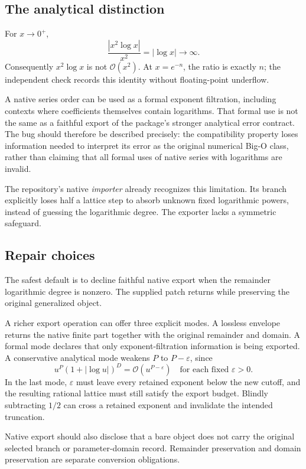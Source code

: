 \documentclass[11pt,a4paper]{article}
\newcommand{\code}[1]{\texttt{\detokenize{#1}}}
\newcommand{\OO}{\mathcal O}
\begin{document}
\subsection{The analytical distinction}
For $x\to0^+$,
\[
 \frac{|x^2\log x|}{x^2}=|\log x|\longrightarrow\infty.
\]
Consequently $x^2\log x$ is not $\OO(x^2)$. At $x=e^{-n}$, the ratio is exactly $n$; the independent check records this identity without floating-point underflow.

A native series order can be used as a formal exponent filtration, including contexts where coefficients themselves contain logarithms. That formal use is not the same as a faithful export of the package's stronger analytical error contract. The bug should therefore be described precisely: the compatibility property loses information needed to interpret its error as the original numerical Big-O class, rather than claiming that all formal uses of native series with logarithms are invalid.\cite{wseriesdata}

The repository's native \emph{importer} already recognizes this limitation. Its \code{SeriesData} branch explicitly loses half a lattice step to absorb unknown fixed logarithmic powers, instead of guessing the logarithmic degree. The exporter lacks a symmetric safeguard.\cite{native}

\subsection{Repair choices}
The safest default is to decline faithful native export when the remainder logarithmic degree is nonzero. The supplied patch returns
\code{Missing["LogarithmicRemainderNotRepresentable"]} while preserving the original generalized object.

A richer export operation can offer three explicit modes. A lossless envelope returns the native finite part together with the original remainder and domain. A formal mode declares that only exponent-filtration information is being exported. A conservative analytical mode weakens $P$ to $P-\varepsilon$, since
\[
 u^P(1+|\log u|)^D=\OO(u^{P-\varepsilon})
 \quad\text{for each fixed }\varepsilon>0.
\]
In the last mode, $\varepsilon$ must leave every retained exponent below the new cutoff, and the resulting rational lattice must still satisfy the export budget. Blindly subtracting $1/2$ can cross a retained exponent and invalidate the intended truncation.

Native export should also disclose that a bare \code{SeriesData} object does not carry the original selected branch or parameter-domain record. Remainder preservation and domain preservation are separate conversion obligations.
\end{document}
